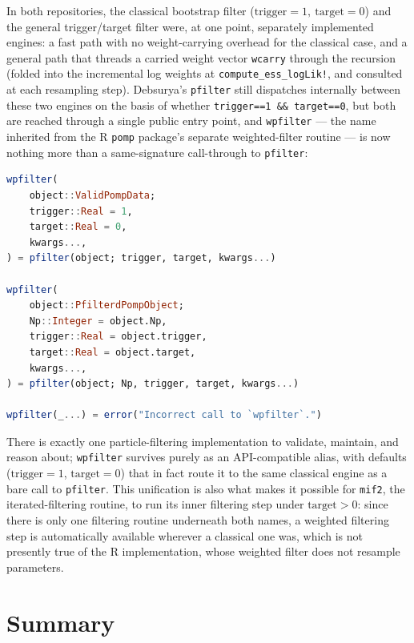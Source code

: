 \documentclass[10pt]{article}
\begin{document}
In both repositories, the classical bootstrap filter
($\mathrm{trigger}=1,\ \mathrm{target}=0$) and the general trigger/target
filter were, at one point, separately implemented engines: a fast path with
no weight-carrying overhead for the classical case, and a general path that
threads a carried weight vector \texttt{wcarry} through the recursion (folded
into the incremental log weights at \texttt{compute\_ess\_logLik!}, and
consulted at each resampling step). Debsurya's \texttt{pfilter} still
dispatches internally between these two engines on the basis of whether
\texttt{trigger==1 \&\& target==0}, but both are reached through a single
public entry point, and \texttt{wpfilter} — the name inherited from the R
\texttt{pomp} package's separate weighted-filter routine — is now nothing
more than a same-signature call-through to \texttt{pfilter}:
\begin{lstlisting}[language=Julia, caption={PartiallyObservedMarkovProcesses.jl/src/wpfilter.jl, in full}]
wpfilter(
    object::ValidPompData;
    trigger::Real = 1,
    target::Real = 0,
    kwargs...,
) = pfilter(object; trigger, target, kwargs...)

wpfilter(
    object::PfilterdPompObject;
    Np::Integer = object.Np,
    trigger::Real = object.trigger,
    target::Real = object.target,
    kwargs...,
) = pfilter(object; Np, trigger, target, kwargs...)

wpfilter(_...) = error("Incorrect call to `wpfilter`.")
\end{lstlisting}
There is exactly one particle-filtering implementation to validate,
maintain, and reason about; \texttt{wpfilter} survives purely as an
API-compatible alias, with defaults ($\mathrm{trigger}=1$,
$\mathrm{target}=0$) that in fact route it to the same classical engine as a
bare call to \texttt{pfilter}. This unification is also what makes it
possible for \texttt{mif2}, the iterated-filtering routine, to run its
inner filtering step under $\mathrm{target}>0$: since there is only one
filtering routine underneath both names, a weighted filtering step is
automatically available wherever a classical one was, which is not presently
true of the R implementation, whose weighted filter does not resample
parameters.

\section{Summary}
\end{document}
